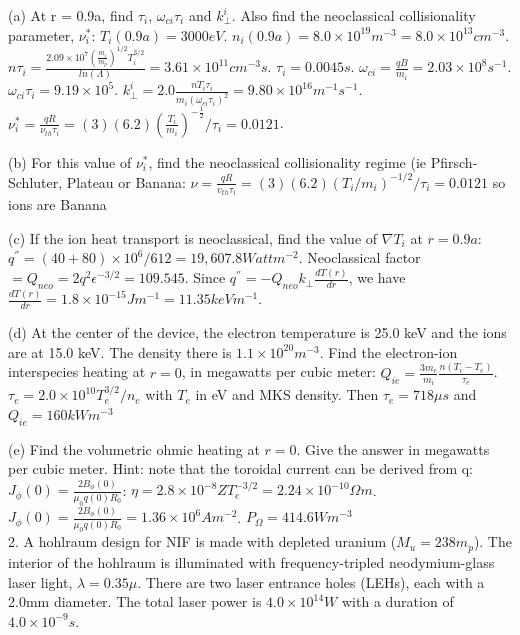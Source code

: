 \documentclass[10pt]{extarticle}
\begin{document}
\begin{multicols}{3}
 (a) At r = 0.9a, find $\tau_{i}$, $\omega_{ci}\tau_{i}$ and $k_{\perp}^{i}$.  Also find the neoclassical collisionality parameter, $\nu_{i}^{*}$:  $T_{i}(0.9a) = 3000eV$.  $n_{i}(0.9a) = 8.0\times 10^{19} m^{-3} = 8.0\times 10^{13} cm^{-3}$.  $n\tau_{i} = \frac{2.09\times 10^{7}(\frac{m_{i}}{m_{p}})^{1/2}T^{3/2}_{i}}{ln(\Lambda)} = 3.61\times 10^{11} cm^{-3} s$.  $\tau_{i} = 0.0045 s$.  $\omega_{ci} = \frac{qB}{m_{i}} = 2.03 \times 10^{8}s^{-1}$. $\omega_{ci}\tau_{i} = 9.19\times 10^{5}$.  $k_{\perp}^{i} = 2.0 \frac{nT_{i}\tau_{i}}{m_{i}(\omega_{ci}\tau_{i})^{2}} = 9.80 \times 10^{16} m^{-1}s^{-1}$.  $\nu_{i}^{*} = \frac{qR}{\nu_{th}\tau_{i}} = (3)(6.2)(\frac{T_{i}}{m_{i}})^{-\frac{1}{2}} / \tau_{i} = 0.0121$.  
 
 (b)  For this value of $\nu^{*}_{i}$, find the neoclassical collisionality regime (ie Pfirsch-Schluter, Plateau or Banana:
$\nu = \frac{qR}{v_{th}\tau_{i}} = (3)(6.2)(T_{i}/m_{i})^{-1/2}/\tau_{i} = 0.0121$ so ions are Banana 
 
 
 (c) If the ion heat transport is neoclassical, find the value of $\nabla T_{i}$ at $r=0.9a$: $q^{''} = (40+80)\times 10^{6}/612 = 19,607.8 Watt m^{-2}$.  Neoclassical factor $ = Q_{neo} = 2q^{2}\epsilon^{-3/2} = 109.545$.  Since $q^{''} = -Q_{neo}k_{\perp}\frac{dT(r)}{dr}$, we have $\frac{dT(r)}{dr} = 1.8 \times 10^{-15}Jm^{-1} = 11.35keVm^{-1}$.
 
 (d) At the center of the device, the electron temperature is 25.0 keV and the ions are at 15.0 keV. The density there is $1.1\times10^{20}m^{-3}$. Find the electron-ion interspecies heating at $r=0$, in megawatts per cubic meter: $Q_{ie} = \frac{3m_{e}}{m_{i}}\frac{n(T_{i}-T_{e})}{\tau_{e}}$.  $\tau_{e} = 2.0\times 10^{10}T_{e}^{3/2}/n_{e}$ with $T_{e}$ in eV and MKS density.  Then $\tau_{e} = 718\mu s$ and $Q_{ie} = 160 kW m^{-3}$ 
 
 (e) Find the volumetric ohmic heating at $r=0$.  Give the answer in megawatts per cubic meter.  Hint: note that the toroidal current can be derived from q: $J_{\phi}(0) = \frac{2B_{\phi}(0)}{\mu_{0} q(0)R_{0}}$: $\eta = 2.8 \times 10^{-8}ZT_{e}^{-3/2} = 2.24\times 10^{-10} \Omega m$.  $J_{\phi}(0) = \frac{2B_{\phi}(0)}{\mu_{0}q(0)R_{0}} = 1.36\times 10^{6} A m^{-2}$.  $P_{\Omega} = 414.6W m^{-3}$\\
2. A hohlraum design for NIF is made with depleted uranium ($M_{u} = 238m_{p}$).  The interior of the hohlraum is illuminated with frequency-tripled neodymium-glass laser light, $\lambda = 0.35\mu$. There are two laser entrance holes (LEHs), each with a 2.0mm diameter.  The total laser power is $4.0\times 10^{14} W$ with a duration of $4.0\times 10^{-9}s$. 


\end{multicols}
\end{document}
